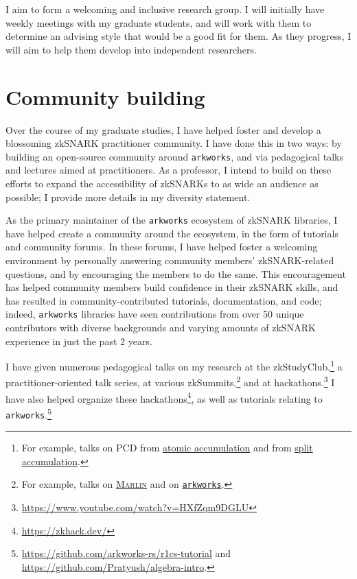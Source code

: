 \documentclass[11pt,letterpaper]{article}
\theoremstyle{definition} %
\theoremstyle{remark} %
\newcommand{\marlin}{\textsc{Marlin}}
\newcommand{\arkworks}{\texttt{arkworks}}
\begin{document}
I aim to form a welcoming and inclusive research group. I will initially have weekly meetings with my graduate students, and will work with them to determine an advising style that would be a good fit for them. As they progress, I will aim to help them develop into independent researchers.

\section{Community building}
\label{sec:community}

Over the course of my graduate studies, I have helped foster and develop a blossoming zkSNARK practitioner community. I have done this in two ways: by building an open-source community around \arkworks{}, and via pedagogical talks and lectures aimed at practitioners. As a professor, I intend to build on these efforts to expand the accessibility of zkSNARKs to as wide an audience as possible; I provide more details in my diversity statement.

\parhead{\arkworks{} mentoring} 
As the primary maintainer of the \arkworks{} ecosystem of zkSNARK libraries, I have helped create a community around the ecosystem, in the form of tutorials and community forums. In these forums, I have helped foster a welcoming environment by personally answering community members' zkSNARK-related questions, and by encouraging the members to do the same. This encouragement has helped community members build confidence in their zkSNARK skills, and has resulted in community-contributed tutorials, documentation, and code; indeed, \arkworks{} libraries have seen contributions from over 50 unique contributors with diverse backgrounds and varying amounts of zkSNARK experience in just the past 2 years.

I have given numerous pedagogical talks on my research at the zkStudyClub,\footnote{For example, talks on PCD from \href{https://www.youtube.com/watch?v=-OXQW5MFDMY}{atomic accumulation} and from \href{https://www.youtube.com/watch?v=TRyep--q6jU}{split accumulation}.} a practitioner-oriented talk series, at various zkSummits,\footnote{For example, talks on \href{https://www.youtube.com/watch?v=bJDLf8KLdL0}{\marlin{}} and on \href{https://www.youtube.com/watch?v=zgSF_dRe4UY}{\arkworks{}}.} and at hackathons.\footnote{\url{https://www.youtube.com/watch?v=HXfZqm9DGLU}} I have also helped organize these hackathons\footnote{\url{https://zkhack.dev/}}, as well as tutorials relating to \arkworks{}.\footnote{\url{https://github.com/arkworks-rs/r1cs-tutorial} and \url{https://github.com/Pratyush/algebra-intro}.}

{
\renewcommand*{\bibfont}{\small}
\printbibliography
}
\end{document}
